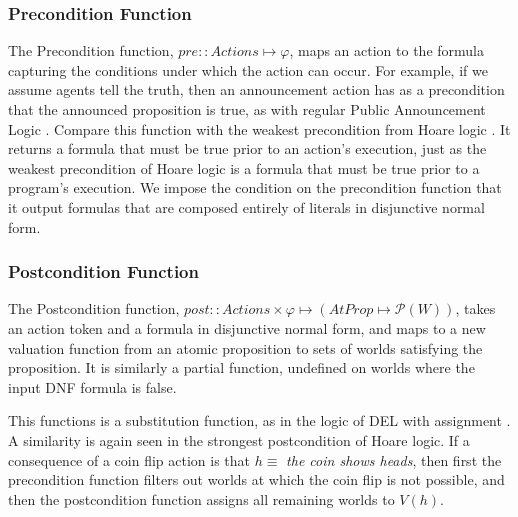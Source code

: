 \subsubsection{Precondition Function}
The Precondition function, $pre :: Actions \mapsto \varphi$, maps an action to the formula capturing the conditions under which the action can occur. For example, if we assume agents tell the truth, then an announcement action has as a precondition that the announced proposition is true, as with regular Public Announcement Logic \cite{PAL}. Compare this function with the weakest precondition from Hoare logic \cite{Hoare}. It returns a formula that must be true prior to an action's execution, just as the weakest precondition of Hoare logic is a formula that must be true prior to a program's execution. We impose the condition on the precondition function that it output formulas that are composed entirely of literals in disjunctive normal form. 


\subsubsection{Postcondition Function}
The Postcondition function, $post :: Actions \times \varphi \mapsto (AtProp \mapsto \mathcal{P}(W))$, takes an action token and a formula in disjunctive normal form, and maps to a new valuation function from an atomic proposition to sets of worlds satisfying the proposition. It is similarly a partial function, undefined on worlds where the input DNF formula is false. 

This functions is a substitution function, as in the logic of DEL with assignment \cite{DELassignment}. A similarity is again seen in the strongest postcondition of Hoare logic. If a consequence of a coin flip action is that $h \equiv $ \emph{the coin shows heads}, then first the precondition function filters out worlds at which the coin flip is not possible, and then the postcondition function assigns all remaining worlds to $V(h)$.

